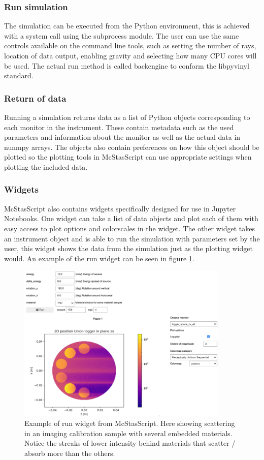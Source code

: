 \documentclass[11pt, a4paper]{article}
\begin{document}
\subsubsection{Run simulation}
The simulation can be executed from the Python environment, this is achieved with a system call using the subprocess module. The user can use the same controls available on the command line tools, such as setting the number of rays, location of data output, enabling gravity and selecting how many CPU cores will be used. The actual run method is called backengine to conform the libpyvinyl standard.

\subsubsection{Return of data}
Running a simulation returns data as a list of Python objects corresponding to each monitor in the instrument. These contain metadata such as the used parameters and information about the monitor as well as the actual data in nunmpy arrays. The objects also contain preferences on how this object should be plotted so the plotting tools in McStasScript can use appropriate settings when plotting the included data. 

\subsubsection{Widgets}
McStasScript also contains widgets specifically designed for use in Jupyter Notebooks. One widget can take a list of data objects and plot each of them with easy access to plot options and colorscales in the widget. The other widget takes an instrument object and is able to run the simulation with parameters set by the user, this widget shows the data from the simulation just as the plotting widget would. An example of the run widget can be seen in figure \ref{fig:widget}.

\begin{figure}
\centering
\includegraphics[width=0.9\textwidth]{figures/widget.png}
\caption{\label{fig:widget}Example of run widget from McStasScript. Here showing scattering in an imaging calibration sample with several embedded materials. Notice the streaks of lower intensity behind materials that scatter / absorb more than the others.}
\end{figure}
\end{document}

